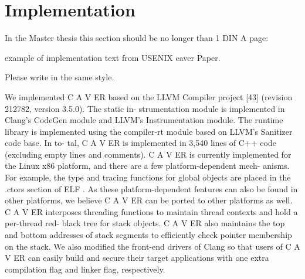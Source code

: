 \chapter{Implementation}
\label{chapter:Implementation}


In the Master thesis this section should be no longer than 1 DIN A page:

example of implementation text from USENIX caver Paper.

Please write in the same style.


We implemented C A V ER based on the LLVM Compiler
project [43] (revision 212782, version 3.5.0). The static in-
strumentation module is implemented in Clang’s CodeGen
module and LLVM’s Instrumentation module. The
runtime library is implemented using the compiler-rt
module based on LLVM’s Sanitizer code base. In to-
tal, C A V ER is implemented in 3,540 lines of C++ code
(excluding empty lines and comments).
C A V ER is currently implemented for the Linux x86
platform, and there are a few platform-dependent mech-
anisms. For example, the type and tracing functions for
global objects are placed in the .ctors section of ELF . As
these platform-dependent features can also be found in
other platforms, we believe C A V ER can be ported to other
platforms as well. C A V ER interposes threading functions
to maintain thread contexts and hold a per-thread red-
black tree for stack objects. C A V ER also maintains the
top and bottom addresses of stack segments to efficiently
check pointer membership on the stack. We also modified
the front-end drivers of Clang so that users of C A V ER can
easily build and secure their target applications with one
extra compilation flag and linker flag, respectively.